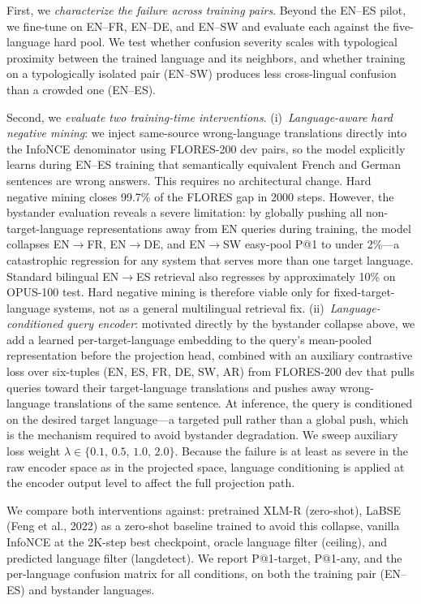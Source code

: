 \documentclass[11pt]{article}
\begin{document}
First, we \textit{characterize the failure across training pairs}. Beyond the EN--ES pilot,
we fine-tune on EN--FR, EN--DE, and EN--SW and evaluate each against the five-language
hard pool. We test whether confusion severity scales with typological proximity between
the trained language and its neighbors, and whether training on a typologically isolated
pair (EN--SW) produces less cross-lingual confusion than a crowded one (EN--ES).

Second, we \textit{evaluate two training-time interventions}. (i)~\textit{Language-aware
hard negative mining}: we inject same-source wrong-language translations directly into the
InfoNCE denominator using FLORES-200 dev pairs, so the model explicitly learns during
EN--ES training that semantically equivalent French and German sentences are wrong answers.
This requires no architectural change. Hard negative mining closes 99.7\% of the FLORES
gap in 2000 steps. However, the bystander evaluation reveals a severe limitation: by
globally pushing all non-target-language representations away from EN queries during
training, the model collapses EN$\to$FR, EN$\to$DE, and EN$\to$SW easy-pool P@1 to
under 2\%---a catastrophic regression for any system that serves more than one target
language. Standard bilingual EN$\to$ES retrieval also regresses by approximately 10\%
on OPUS-100 test. Hard negative mining is therefore viable only for fixed-target-language
systems, not as a general multilingual retrieval fix. (ii)~\textit{Language-conditioned query encoder}:
motivated directly by the bystander collapse above, we add a learned per-target-language
embedding to the query's mean-pooled representation before the projection head, combined
with an auxiliary contrastive loss over six-tuples (EN, ES, FR, DE, SW, AR) from
FLORES-200 dev that pulls queries toward their target-language translations and pushes
away wrong-language translations of the same sentence. At inference, the query is
conditioned on the desired target language---a targeted pull rather than a global push,
which is the mechanism required to avoid bystander degradation. We sweep auxiliary loss
weight $\lambda \in \{0.1,\,0.5,\,1.0,\,2.0\}$. Because the failure is at least
as severe in the raw encoder space as in the projected space, language conditioning is
applied at the encoder output level to affect the full projection path.

We compare both interventions against: pretrained XLM-R (zero-shot), LaBSE (Feng et al.,
2022) as a zero-shot baseline trained to avoid this collapse, vanilla InfoNCE at the 2K-step
best checkpoint, oracle language filter (ceiling), and predicted language filter
(langdetect). We report P@1-target, P@1-any, and the per-language confusion matrix for
all conditions, on both the training pair (EN--ES) and bystander languages.
\end{document}

